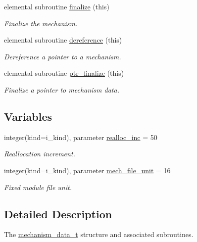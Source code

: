 \begin{DoxyCompactItemize}
elemental subroutine \mbox{\hyperlink{namespacepmc__mechanism__data_ad685960e0431b5b2d9c3b952777c0145}{finalize}} (this)
\begin{DoxyCompactList}\small\item\em Finalize the mechanism. \end{DoxyCompactList}\item 
elemental subroutine \mbox{\hyperlink{namespacepmc__mechanism__data_acb9f7c490ea7619fdf383db20023202d}{dereference}} (this)
\begin{DoxyCompactList}\small\item\em Dereference a pointer to a mechanism. \end{DoxyCompactList}\item 
elemental subroutine \mbox{\hyperlink{namespacepmc__mechanism__data_ad03843746b59d1b24473475c733a9571}{ptr\+\_\+finalize}} (this)
\begin{DoxyCompactList}\small\item\em Finalize a pointer to mechanism data. \end{DoxyCompactList}\end{DoxyCompactItemize}
\subsection*{Variables}
\begin{DoxyCompactItemize}
\item 
integer(kind=i\+\_\+kind), parameter \mbox{\hyperlink{namespacepmc__mechanism__data_aef2ce48961a795851e8e21d560de452f}{realloc\+\_\+inc}} = 50
\begin{DoxyCompactList}\small\item\em Reallocation increment. \end{DoxyCompactList}\item 
integer(kind=i\+\_\+kind), parameter \mbox{\hyperlink{namespacepmc__mechanism__data_a93f8a07cd95177a3ace0557137076622}{mech\+\_\+file\+\_\+unit}} = 16
\begin{DoxyCompactList}\small\item\em Fixed module file unit. \end{DoxyCompactList}\end{DoxyCompactItemize}


\subsection{Detailed Description}
The \mbox{\hyperlink{structpmc__mechanism__data_1_1mechanism__data__t}{mechanism\+\_\+data\+\_\+t}} structure and associated subroutines. 

